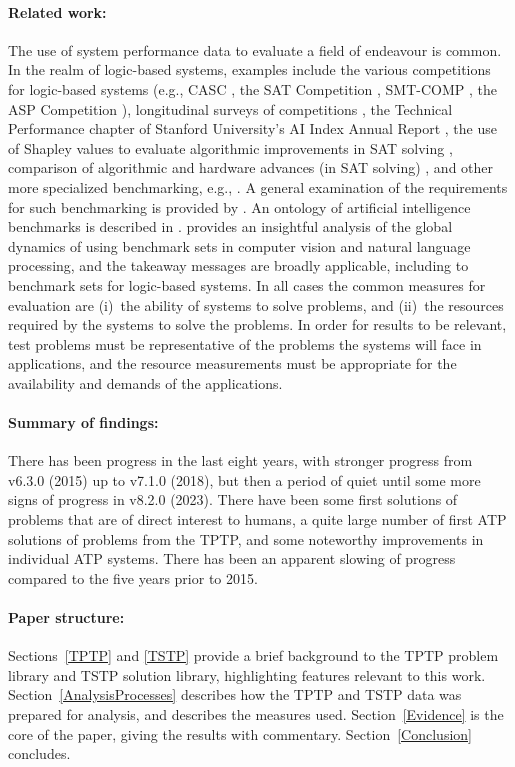 \documentclass[runningheads]{llncs}
\begin{document}
\paragraph{Related work:}
The use of system performance data to evaluate a field of endeavour is common.
In the realm of logic-based systems, examples include
the various competitions \cite{BB+19} for logic-based systems (e.g., CASC \cite{Sut16}, the SAT 
Competition \cite{JL+12}, SMT-COMP \cite{BdS05}, the ASP Competition \cite{CI+12}),
longitudinal surveys of competitions \cite{SS06-SoCASC,CSW15},
the Technical Performance chapter of Stanford University's AI Index Annual Report \cite{MF+23},
the use of Shapley values to evaluate algorithmic improvements in SAT solving \cite{FK+16,KF+19},
comparison of algorithmic and hardware advances (in SAT solving) \cite{FHS20},
and
other more specialized benchmarking, e.g., \cite{ZHP22}.
A general examination of the requirements for such benchmarking is provided by \cite{BLW19}.
An ontology of artificial intelligence benchmarks is described in \cite{BB+22-SD}.
\cite{OB+22} provides an insightful analysis of the global dynamics of using benchmark sets in
computer vision and natural language processing, and the takeaway messages are broadly applicable,
including to benchmark sets for logic-based systems.
In all cases the common measures for evaluation are (i)~the ability of systems to solve problems, 
and (ii)~the resources required by the systems to solve the problems.
In order for results to be relevant, test problems must be representative of the problems
the systems will face in applications, and the resource measurements must be appropriate for 
the availability and demands of the applications.

\paragraph{Summary of findings:}
There has been progress in the last eight years, with stronger progress from v6.3.0 (2015) up 
to v7.1.0 (2018), but then a period of quiet until some more signs of progress in v8.2.0 (2023).
There have been some first solutions of problems that are of direct interest to humans,
a quite large number of first ATP solutions of problems from the TPTP, and
some noteworthy improvements in individual ATP systems.
There has been an apparent slowing of progress compared to the five years prior to 2015.

\paragraph{Paper structure:}
Sections~\ref{TPTP} and \ref{TSTP} provide a brief background to the TPTP problem library and
TSTP solution library, highlighting features relevant to this work.
Section~\ref{AnalysisProcesses} describes how the TPTP and TSTP data was prepared for
analysis, and describes the measures used.
Section~\ref{Evidence} is the core of the paper, giving the results with commentary.
Section~\ref{Conclusion} concludes.
\end{document}
